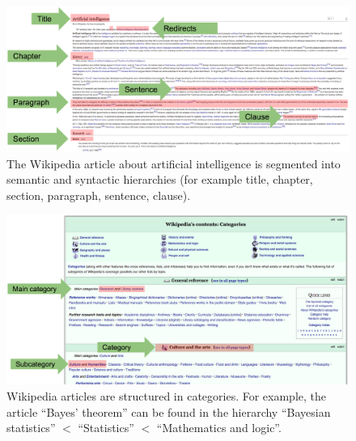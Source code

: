 
\begin{figure}
	\centering
	\includegraphics[width=1.0\textwidth]{1introduction/hierarchies-wikipedia-syntax.png}
	\caption[Caption for LOF]{The Wikipedia article about artificial intelligence is segmented into semantic and syntactic hierarchies (for example title, chapter, section, paragraph, sentence, clause).\footnotemark}
	\label{fig:1:hierarchies-wikipedia-syntax}
\end{figure}


\begin{figure}
	\centering
	\includegraphics[width=1.0\textwidth]{1introduction/hierarchies-wikipedia-categories.png}
	\caption[Caption for LOF]{Wikipedia articles are structured in categories. For example, the article ``Bayes' theorem'' can be found in the hierarchy ``Bayesian statistics'' $<$ ``Statistics'' $<$ ``Mathematics and logic''.\footnotemark}
	\label{fig:1:hierarchies-categories}
\end{figure}


